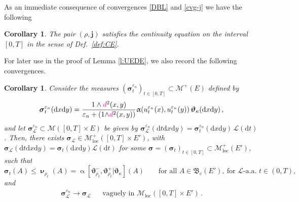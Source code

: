 \documentclass[11pt,reqno]{amsart}
\numberwithin{equation}{section}
\newcommand{\calM}{\mathcal{M}}
\newcommand{\scrL}{\mathscr{L}}
\newcommand{\eps}{\varepsilon}
\newcommand{\dd}{\mathrm{d}}
\newtheorem{corollary}[theorem]{Corollary}
\theoremstyle{definition}
\newcommand{\ep}{\varepsilon}
\let\eps\ep
\def\dd{\mathrm{d}}
\newcommand{\teta}{\boldsymbol \vartheta}
\newcommand{\tetapi}{\boldsymbol{\teta}_{\kappa}}
\def\Aalpha{\upalpha}
\newcommand{\Lebone}{\scrL}
\newcommand{\bnu}{\boldsymbol\upnu}
\newcommand{\bj}{{\boldsymbol j}}
\newcommand{\nn}{{\boldsymbol{n}}}
\newcommand{\bss}{{\boldsymbol{s}}}
\newcommand{\Ed}{{E'}}
\newcommand{\Mloc}{\mathcal{M}_{\mathrm{loc}}}
\newcommand{\ej}{\eps_n}
\newcommand{\ssigma}{\boldsymbol \sigma}
\newcommand{\nnu}{\boldsymbol \nu}
\newcommand{\RNEW}{\color{black}} %
\newcommand{\TODO}[1]{\todo[inline, color=cyan!20]{#1}}
\newcommand{\EEE}{\color{black}}
\newcommand{\dpi}{{\color{magenta} d}}
\numberwithin{equation}{section}
\begin{document}
\medskip
As an immediate consequence of convergences  \eqref{DBL} and \eqref{cvg-j} we have the following
\begin{corollary}
The pair $(\rho,\bj) $ satisfies   the continuity equation on the interval  $[0,T]$  in the sense of Def.\ \ref{def:CE}. 
\end{corollary}



\par
\RNEW For later use in the proof of Lemma \ref{l:UEDE}, we also record the following convergences. \EEE
\begin{corollary}
 Consider the measures $(\ssigma_t^{\ej})_{t\in [0,T]} \subset \calM^+(E)$ defined by
\[
\ssigma_t^{\ej} (\dd x \dd y) =  \frac{1\wedge \dpi^2(x,y)}{\ej + (1{\wedge}  \dpi^2(x,y))} \upalpha(u_t^{\ej}(x),u_t^{\ej}(y) ) \, \tetapi(\dd x \dd y)\,,
    \]
     and let $\ssigma_{\Lebone}^{\ej} \subset \calM([0,T]{\times}E)$ be given by 
    $\ssigma_{\Lebone}^{\ej} (\dd t \dd x \dd y) = \ssigma_t^{\ej} (\dd x \dd y) \, \Lebone(\dd t)$.
\RNEW    Then, there exists $ \ssigma_\Lebone \in   \Mloc^+([0,T]{\times}\Ed)$, with 
$\ssigma_\Lebone(\dd t \dd x \dd y )= \ssigma_t (\dd x \dd y) \Lebone (\dd t)$ for some $\ssigma = (\ssigma_t)_{t\in[0,T]} \subset \Mloc^+(\Ed)$, such that 
\begin{equation}
\label{key-absolute-continuity}
\ssigma_t (A) \leq  \bnu_{\rho_t}(A) =  \Aalpha[\teta_{\rho_t}^-,\teta_{\rho_t}^+|\tetapi](A)  \qquad \text{for  all } A \in  \mathfrak{B}_{\mathrm{c}}(\Ed),  \
 \text{for }\Lebone\text{-a.a.\ } t \in (0,T),
\end{equation}
and 
        \begin{align}
    \label{vague-signa}
  \ssigma_{\Lebone}^{\ej} \to \ssigma_\Lebone   && \text{vaguely in }  \Mloc([0,T]{\times}\Ed)\,.
\end{align}
\end{corollary}  
%    
%
\end{document}
